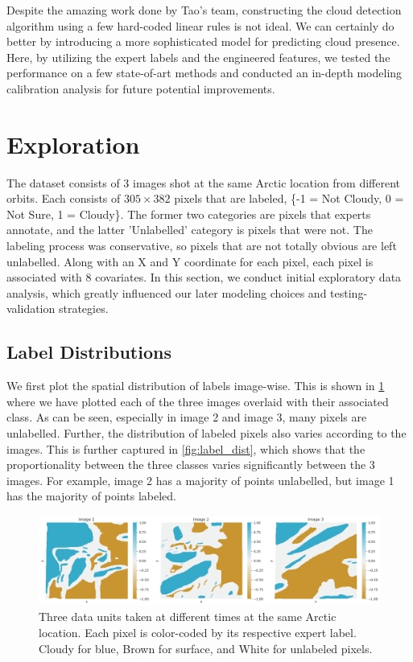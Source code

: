 \documentclass[11pt, letterpaper, journal]{IEEEtran}
\begin{document}
Despite the amazing work done by Tao's team, constructing the cloud detection algorithm using a few hard-coded linear rules is not ideal. We can certainly do better by introducing a more sophisticated model for predicting cloud presence. Here, by utilizing the expert labels and the engineered features, we tested the performance on a few state-of-art methods and conducted an in-depth modeling calibration analysis for future potential improvements. 

\section{Exploration}
The dataset consists of 3 images shot at the same Arctic location from different orbits. Each consists of $305 \times 382$ pixels that are labeled, \{-1 = Not Cloudy, 0 = Not Sure, 1 = Cloudy\}. The former two categories are pixels that experts annotate, and the latter 'Unlabelled' category is pixels that were not. The labeling process was conservative, so pixels that are not totally obvious are left unlabelled. Along with an X and Y coordinate for each pixel, each pixel is associated with 8 covariates. In this section, we conduct initial exploratory data analysis, which greatly influenced our later modeling choices and testing-validation strategies.

\subsection{Label Distributions}
We first plot the spatial distribution of labels image-wise. This is shown in \ref{fig:image_labels} where we have plotted each of the three images overlaid with their associated class. As can be seen, especially in image 2 and image 3, many pixels are unlabelled. Further, the distribution of labeled pixels also varies according to the images. This is further captured in \ref{fig:label_dist}, which shows that the proportionality between the three classes varies significantly between the 3 images. For example, image 2 has a majority of points unlabelled, but image 1 has the majority of points labeled.

\begin{figure}[!h]
\centering
\includegraphics[width=1.0\textwidth]{1.a.png}
\caption{Three data units taken at different times at the same Arctic location. Each pixel is color-coded by its respective expert label. Cloudy for blue, Brown for surface, and White for unlabeled pixels.}
\label{fig:image_labels}
\end{figure}
\end{document}
